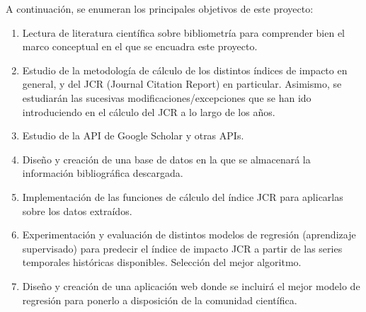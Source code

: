 
A continuación, se enumeran los principales objetivos de este proyecto:

\begin{enumerate}
\item Lectura de literatura científica sobre bibliometría para comprender bien el marco conceptual en el que se encuadra este proyecto.
\item Estudio de la metodología de cálculo de los distintos índices de impacto en general, y del JCR (Journal Citation Report) en particular. Asimismo, se estudiarán las sucesivas modificaciones/excepciones que se han ido introduciendo en el cálculo del JCR a lo largo de los años.
\item Estudio de la API de Google Scholar y otras APIs.
\item Diseño y creación de una base de datos en la que se almacenará la información bibliográfica descargada.
\item Implementación de las funciones de cálculo del índice JCR para aplicarlas sobre los datos extraídos. 
\item Experimentación y evaluación de distintos modelos de regresión (aprendizaje supervisado) para predecir el índice de impacto JCR a partir de las series temporales históricas disponibles. Selección del mejor algoritmo.
\item Diseño y creación de una aplicación web donde se incluirá el mejor modelo de regresión para ponerlo a disposición de la comunidad científica.
\end{enumerate}